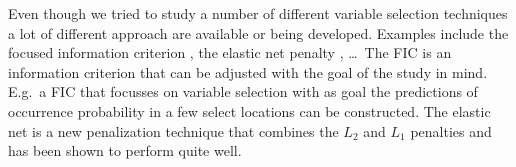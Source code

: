 Even though we tried to study a number of different variable selection techniques a lot of different approach are available or being developed. Examples include the focused information criterion \parencite[FIC, ][]{claeskens_focused_2003}, the elastic net penalty \parencite{zou_regularization_2005}, \dots\ The FIC is an information criterion that can be adjusted with the goal of the study in mind. E.g.\ a FIC that focusses on variable selection with as goal the predictions of occurrence probability in a few select locations can be constructed. The elastic net is a new penalization technique that combines the $L_2$ and $L_1$ penalties and has been shown to perform quite well.\\

